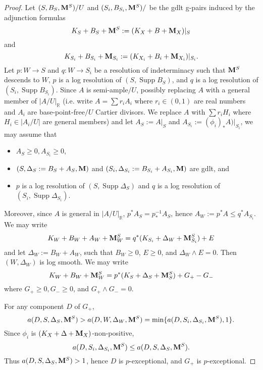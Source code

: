 \documentclass[11pt]{amsart}
\numberwithin{equation}{section}
\newcommand{\Mm}{{\bf{M}}}
\newcommand{\Rr}{\mathbb{R}}
\newcommand{\Supp}{\operatorname{Supp}}
\theoremstyle{definition}
\theoremstyle{definition}
\theoremstyle{definition}
\begin{document}
\begin{proof}
Let $(S,B_S,\Mm^S)/U$ and $(S_i,B_{S_i},\Mm^S)/$ be the gdlt g-pairs induced by the adjunction formulas
$$K_S+B_S+\Mm^S:=(K_X+B+\Mm_X)|_S$$
and
$$K_{S_i}+B_{S_i}+\Mm_{S_i}:=(K_{X_i}+B_i+\Mm_{X_i})|_{S_i}.$$
Let $p: W\rightarrow S$ and $q: W\rightarrow S_i$ be a resolution of indeterminacy such that $\Mm^S$ descends to $W$, $p$ is a log resolution of $(S,\Supp B_S)$, and $q$ is a log resolution of $(S_i,\Supp B_{S_i})$. Since $A$ is semi-ample$/U$, possibly replacing $A$ with a general member of $|A/U|_{\Rr}$ (i.e. write $A=\sum r_iA_i$ where $r_i\in (0,1)$ are real numbers and $A_i$ are base-point-free$/U$ Cartier divisors. We replace $A$ with $\sum r_iH_i$ where $H_i\in |A_i/U|$ are general members) and let $A_S:=A|_S$ and $A_{S_i}:=(\phi_i)_*A)|_{S_i}$, we may assume that 
\begin{itemize}
\item $A_S\geq 0, A_{S_i}\geq 0$,
    \item $(S,\Delta_S:=B_S+A_S,\Mm)$ and $(S_i,\Delta_{S_i}:=B_{S_i}+A_{S_i},\Mm)$ are gdlt, and
    \item $p$ is a log resolution of $(S,\Supp\Delta_S)$ and $q$ is a log resolution of $(S_i,\Supp\Delta_{S_i})$.
\end{itemize}
Moreover, since $A$ is general in $|A/U|_{\Rr}$, $p^*A_S=p^{-1}_*A_S$, hence $A_W:=p^*A\leq q^*A_{S_i}$. We may write
$$K_W+B_W+A_W+\Mm^S_W=q^*(K_{S_i}+\Delta_W+\Mm^S_{S_i})+E$$
and let $\Delta_W:=B_W+A_W$, such that $B_W\geq 0$, $E\geq 0$, and $\Delta_W\wedge E=0$. Then $(W,\Delta_W)$ is log smooth. We may write
$$K_W+B_W+\Mm^S_W=p^*(K_S+\Delta_S+\Mm^S_S)+G_+-G_-$$
where $G_+\geq 0, G_-\geq 0$, and $G_+\wedge G_-=0$. 

For any component $D$ of $G_+$, 
$$a(D,S,\Delta_S,\Mm^S)>a(D,W,\Delta_W,\Mm^S)=\min\{a(D,S_i,\Delta_{S_i},\Mm^S),1\}.$$
Since $\phi_i$ is $(K_X+\Delta+\Mm_X)$-non-positive, $$a(D,S_i,\Delta_{S_i},\Mm^S)\leq a(D,S,\Delta_{S},\Mm^S).$$
Thus $a(D,S,\Delta_S,\Mm^S)>1$, hence $D$ is $p$-exceptional, and $G_+$ is $p$-exceptional.


\end{proof}
\end{document}
